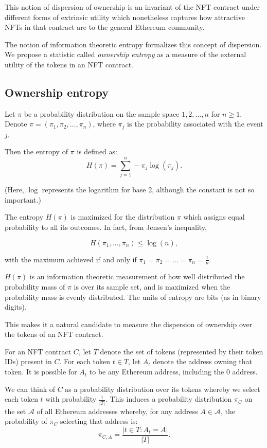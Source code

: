 \documentclass{article}
\begin{document}
This notion of dispersion of ownership is an invariant of the NFT contract under different forms of extrinsic utility which nonetheless captures how attractive NFTs in that contract are to the general Ethereum community.

The notion of information theoretic entropy formalizes this concept of dispersion. We propose a statistic called \emph{ownership entropy} as a measure of the external utility of the tokens in an NFT contract.


\subsection{Ownership entropy}

Let $\pi$ be a probability distribution on the sample space ${1, 2, \ldots, n}$ for $n \geq 1$. Denote $\pi = (\pi_1, \pi_2, \ldots, \pi_n)$, where $\pi_j$ is the probability associated with the event $j$.

Then the entropy of $\pi$ is defined as: $$H(\pi) = \sum_{j=1}^n -\pi_j \log(\pi_j).$$

(Here, $\log$ represents the logarithm for base 2, although the constant is not so important.)

The entropy $H(\pi)$ is maximized for the distribution $\pi$ which assigns equal probability to all its outcomes. In fact, from Jensen's inequality,

$$H(\pi_1, \ldots, \pi_n) \leq \log(n),$$

with the maximum achieved if and only if $\pi_1 = \pi_2 = \ldots = \pi_n = \frac{1}{n}$.

$H(\pi)$ is an information theoretic measurement of how well distributed the probability mass of $\pi$ is over its sample set, and is maximized when the probability mass is evenly distributed. The units of entropy are bits (as in binary digits).

This makes it a natural candidate to measure the dispersion of ownership over the tokens of an NFT contract.

For an NFT contract $C$, let $T$ denote the set of tokens (represented by their token IDs) present in $C$. For each token $t \in T$, let $A_t$ denote the address owning that token. It is possible for $A_t$ to be any Ethereum address, including the $0$ address.

We can think of $C$ as a probability distribution over its tokens whereby we select each token $t$ with probability $\frac{1}{|T|}$. This induces a probability distribution $\pi_C$ on the set $\mathcal{A}$ of all Ethereum addresses whereby, for any address $A \in \mathcal{A}$, the probability of $\pi_C$ selecting that address is: $$\pi_{C,A} = \frac{|{t \in T : A_t = A}|}{|T|}.$$
\end{document}
